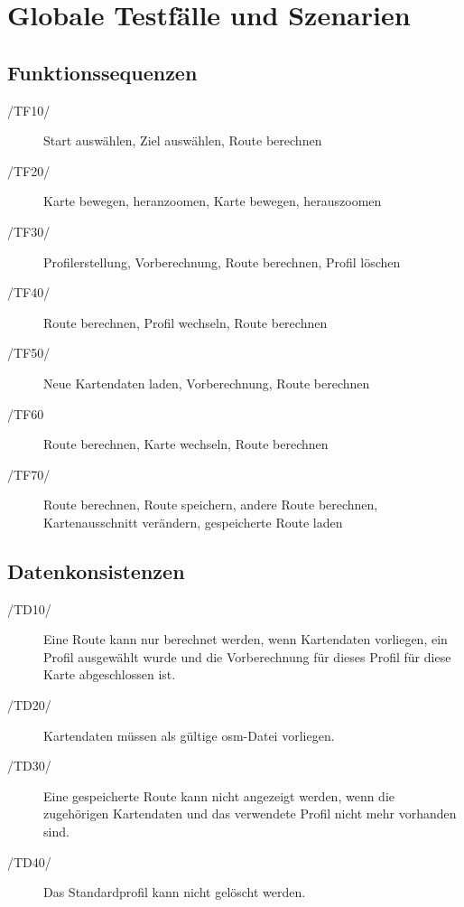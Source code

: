 \documentclass[a4paper, 11pt]{article}
\begin{document}
\section{Globale Testfälle und Szenarien}
\subsection{Funktionssequenzen}
\begin{description}
\item[/TF10/]
Start auswählen, Ziel auswählen, Route berechnen\\
\item[/TF20/]
Karte bewegen, heranzoomen, Karte bewegen, herauszoomen\\
\item[/TF30/]
Profilerstellung, Vorberechnung, Route berechnen, Profil löschen\\
\item[/TF40/]
Route berechnen, Profil wechseln, Route berechnen\\
\item[/TF50/]
Neue Kartendaten laden, Vorberechnung, Route berechnen\\
\item[/TF60]
Route berechnen, Karte wechseln, Route berechnen\\
\item[/TF70/]
Route berechnen, Route speichern, andere Route berechnen, Kartenausschnitt verändern, gespeicherte Route laden\\
\end{description}
\subsection{Datenkonsistenzen}
\begin{description}
\item[/TD10/]
Eine Route kann nur berechnet werden, wenn Kartendaten vorliegen, ein Profil ausgewählt wurde und die Vorberechnung für dieses Profil für diese Karte abgeschlossen ist.\\
\item[/TD20/]
Kartendaten müssen als gültige osm-Datei vorliegen.\\
\item[/TD30/]
Eine gespeicherte Route kann nicht angezeigt werden, wenn die zugehörigen Kartendaten und das verwendete Profil nicht mehr vorhanden sind.\\
\item[/TD40/]
Das Standardprofil kann nicht gelöscht werden.\\
\end{description}
\end{document}
